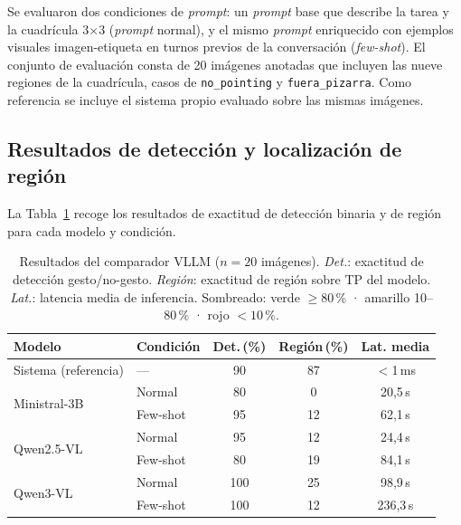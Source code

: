 \documentclass[12pt]{report} %
\begin{document}
Se evaluaron dos condiciones de \textit{prompt}: un \textit{prompt} base que describe la tarea y la cuadrícula 3$\times$3 (\textit{prompt} normal), y el mismo \textit{prompt} enriquecido con ejemplos visuales imagen-etiqueta en turnos previos de la conversación (\textit{few-shot}). El conjunto de evaluación consta de 20 imágenes anotadas que incluyen las nueve regiones de la cuadrícula, casos de \texttt{no\_pointing} y \texttt{fuera\_pizarra}. Como referencia se incluye el sistema propio evaluado sobre las mismas imágenes.

\subsection{Resultados de detección y localización de región}

La Tabla~\ref{tab:vllm} recoge los resultados de exactitud de detección binaria y de región para cada modelo y condición.

\begin{table}[H]
\caption{\label{tab:vllm}Resultados del comparador VLLM ($n = 20$ imágenes). \textit{Det.}: exactitud de detección gesto/no-gesto. \textit{Región}: exactitud de región sobre TP del modelo. \textit{Lat.}: latencia media de inferencia. Sombreado: \colorbox{green!25}{verde} $\geq 80$\,\% · \colorbox{yellow!35}{amarillo} 10--80\,\% · \colorbox{red!20}{rojo} $< 10$\,\%.}
\begin{tabular}{llccc}
\hline
\textbf{Modelo} & \textbf{Condición} & \textbf{Det.\,(\%)} & \textbf{Región\,(\%)} & \textbf{Lat. media} \\
\hline
Sistema (referencia) & — & \cellcolor{green!25}90 & \cellcolor{green!25}87 & $<$1\,ms \\
\hline
\multirow{2}{*}{Ministral-3B}
  & Normal   & \cellcolor{yellow!35}80 & \cellcolor{red!20}0   & 20{,}5\,s \\
  & Few-shot & \cellcolor{green!25}95 & \cellcolor{yellow!35}12 & 62{,}1\,s \\
\hline
\multirow{2}{*}{Qwen2.5-VL}
  & Normal   & \cellcolor{green!25}95 & \cellcolor{yellow!35}12 & 24{,}4\,s \\
  & Few-shot & \cellcolor{yellow!35}80 & \cellcolor{yellow!35}19 & 84{,}1\,s \\
\hline
\multirow{2}{*}{Qwen3-VL}
  & Normal   & \cellcolor{green!25}100 & \cellcolor{yellow!35}25 & 98{,}9\,s \\
  & Few-shot & \cellcolor{green!25}100 & \cellcolor{yellow!35}12 & 236{,}3\,s \\
\hline
\end{tabular}
\end{table}
\end{document}
